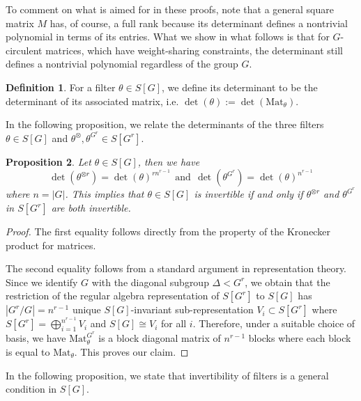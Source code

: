 \documentclass[final]{article}
\newcommand{\Mat}{\text{Mat}}
\theoremstyle{definition}
\newtheorem{definition}{Definition}[section] %
\theoremstyle{plain}
\newtheorem{proposition}[definition]{Proposition}
\begin{document}
To comment on what is aimed for in these proofs, note that a general square matrix $M$ has, of course, a full rank because its determinant defines a nontrivial polynomial in terms of its entries. 
What we show in what follows is that for $G$-circulent matrices, which have weight-sharing constraints, the determinant still defines a nontrivial polynomial regardless of the group $G$.
\begin{definition}
    For a filter $\theta \in S[G]$, we define its determinant to be the determinant of its associated matrix, i.e. $\det(\theta) := \det(\Mat_\theta)$.
\end{definition}

In the following proposition, we relate the determinants of the three filters $\theta \in S[G]$ and $\theta^{\otimes}, \theta^{G^r} \in S[G^r]$.

\begin{proposition}\label{prop: det_formualae}
Let $\theta \in S[G]$, then we have 
\[
\det(\theta^{\otimes r})= \det(\theta)^{rn^{r-1}}\ \ \text{and}\ \ \det(\theta^{G^r}) = \det(\theta)^{n^{r-1}}
\]
where $n= |G|$. 
This implies that $\theta \in S[G]$ is invertible if and only if $\theta^{\otimes r}$ and $\theta^{G^r}$ in $S[G^r]$ are both invertible.
\end{proposition}
\begin{proof}
    The first equality follows directly from the property of the Kronecker product for matrices. 

    The second equality follows from a standard argument in representation theory. 
    Since we identify $G$ with the diagonal subgroup $\Delta < G^r$, we obtain that the restriction of the regular algebra representation of $S[G^r]$ to $S[G]$ has $|G^r/G| = n^{r-1}$ unique $S[G]$-invariant sub-representation $V_i \subset S[G^r]$ where $S[G^r] = \bigoplus_{i=1}^{n^{r-1}} V_i$ and  $S[G] \cong V_i$ for all $i$. Therefore, under a suitable choice of basis, we have $\Mat_\theta^{G^r}$ is a block diagonal matrix of $n^{r-1}$ blocks where each block is equal to $\Mat_\theta$.
    This proves our claim.
\end{proof}


In the following proposition, we state that invertibility of filters is a general condition in $S[G]$.
\end{document}
